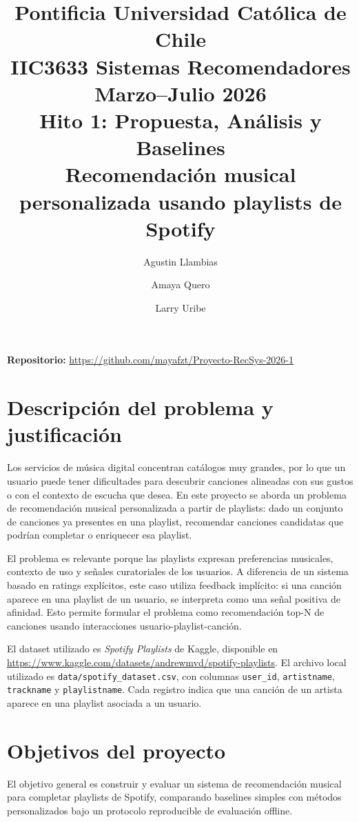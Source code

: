 \documentclass[10pt,letterpaper]{article}
\title{\vspace{-1.2cm}
\normalsize Pontificia Universidad Católica de Chile\\
\normalsize IIC3633 Sistemas Recomendadores\\
\normalsize Marzo--Julio 2026\\[0.35em]
\Large Hito 1: Propuesta, Análisis y Baselines\\
\large Recomendación musical personalizada usando playlists de Spotify}
\author{Agustin Llambias \and Amaya Quero \and Larry Uribe}
\date{}
\begin{document}
\maketitle
\vspace{-0.9cm}

\begin{center}
\small \textbf{Repositorio:} \url{https://github.com/mayafzt/Proyecto-RecSys-2026-1}
\end{center}
\vspace{-0.2cm}

\section{Descripción del problema y justificación}

Los servicios de música digital concentran catálogos muy grandes, por lo que un usuario puede tener dificultades para descubrir canciones alineadas con sus gustos o con el contexto de escucha que desea. En este proyecto se aborda un problema de recomendación musical personalizada a partir de playlists: dado un conjunto de canciones ya presentes en una playlist, recomendar canciones candidatas que podrían completar o enriquecer esa playlist.

El problema es relevante porque las playlists expresan preferencias musicales, contexto de uso y señales curatoriales de los usuarios. A diferencia de un sistema basado en ratings explícitos, este caso utiliza feedback implícito: si una canción aparece en una playlist de un usuario, se interpreta como una señal positiva de afinidad. Esto permite formular el problema como recomendación top-N de canciones usando interacciones usuario-playlist-canción.

El dataset utilizado es \textit{Spotify Playlists} de Kaggle, disponible en \url{https://www.kaggle.com/datasets/andrewmvd/spotify-playlists}. El archivo local utilizado es \texttt{data/spotify\_dataset.csv}, con columnas \texttt{user\_id}, \texttt{artistname}, \texttt{trackname} y \texttt{playlistname}. Cada registro indica que una canción de un artista aparece en una playlist asociada a un usuario.

\section{Objetivos del proyecto}

El objetivo general es construir y evaluar un sistema de recomendación musical para completar playlists de Spotify, comparando baselines simples con métodos personalizados bajo un protocolo reproducible de evaluación offline.
\end{document}
